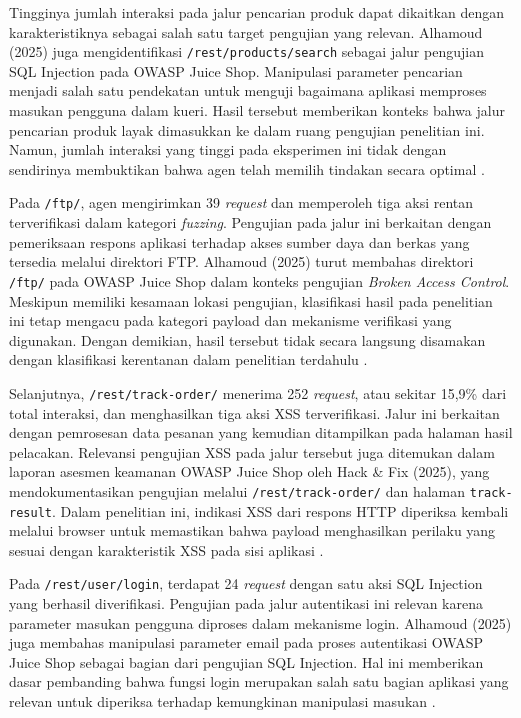 \begin{enumerate}
Tingginya jumlah interaksi pada jalur pencarian produk dapat dikaitkan dengan karakteristiknya sebagai salah satu target pengujian yang relevan. Alhamoud (2025) juga mengidentifikasi \texttt{/rest/products/search} sebagai jalur pengujian SQL Injection pada OWASP Juice Shop. Manipulasi parameter pencarian menjadi salah satu pendekatan untuk menguji bagaimana aplikasi memproses masukan pengguna dalam kueri. Hasil tersebut memberikan konteks bahwa jalur pencarian produk layak dimasukkan ke dalam ruang pengujian penelitian ini. Namun, jumlah interaksi yang tinggi pada eksperimen ini tidak dengan sendirinya membuktikan bahwa agen telah memilih tindakan secara optimal \cite{alhamoud2025}.

Pada \texttt{/ftp/}, agen mengirimkan 39 \textit{request} dan memperoleh tiga aksi rentan terverifikasi dalam kategori \textit{fuzzing}. Pengujian pada jalur ini berkaitan dengan pemeriksaan respons aplikasi terhadap akses sumber daya dan berkas yang tersedia melalui direktori FTP. Alhamoud (2025) turut membahas direktori \texttt{/ftp/} pada OWASP Juice Shop dalam konteks pengujian \textit{Broken Access Control}. Meskipun memiliki kesamaan lokasi pengujian, klasifikasi hasil pada penelitian ini tetap mengacu pada kategori payload dan mekanisme verifikasi yang digunakan. Dengan demikian, hasil tersebut tidak secara langsung disamakan dengan klasifikasi kerentanan dalam penelitian terdahulu \cite{alhamoud2025}.

Selanjutnya, \texttt{/rest/track-order/} menerima 252 \textit{request}, atau sekitar 15,9\% dari total interaksi, dan menghasilkan tiga aksi XSS terverifikasi. Jalur ini berkaitan dengan pemrosesan data pesanan yang kemudian ditampilkan pada halaman hasil pelacakan. Relevansi pengujian XSS pada jalur tersebut juga ditemukan dalam laporan asesmen keamanan OWASP Juice Shop oleh Hack \& Fix (2025), yang mendokumentasikan pengujian melalui \texttt{/rest/track-order/} dan halaman \texttt{track-result}. Dalam penelitian ini, indikasi XSS dari respons HTTP diperiksa kembali melalui browser untuk memastikan bahwa payload menghasilkan perilaku yang sesuai dengan karakteristik XSS pada sisi aplikasi \cite{hackandfix2025}.

Pada \texttt{/rest/user/login}, terdapat 24 \textit{request} dengan satu aksi SQL Injection yang berhasil diverifikasi. Pengujian pada jalur autentikasi ini relevan karena parameter masukan pengguna diproses dalam mekanisme login. Alhamoud (2025) juga membahas manipulasi parameter email pada proses autentikasi OWASP Juice Shop sebagai bagian dari pengujian SQL Injection. Hal ini memberikan dasar pembanding bahwa fungsi login merupakan salah satu bagian aplikasi yang relevan untuk diperiksa terhadap kemungkinan manipulasi masukan \cite{alhamoud2025}.


\end{enumerate}
